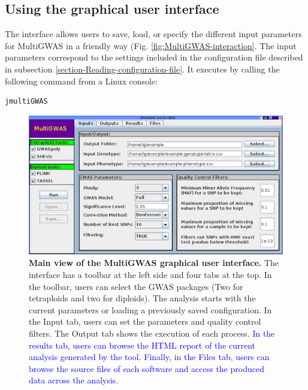 \documentclass{article}
\begin{document}

\subsection{Using the graphical user interface}
The interface allows users to save, load, or specify the different input parameters for MultiGWAS in a friendly way (Fig. \ref{fig:MultiGWAS-interaction}. The input parameters correspond to the settings included in the configuration file described in subsection \ref{section-Reading-configuration-file}. It executes by calling the following command from a Linux console:

\begin{lstlisting}[language=bash,basicstyle={\small}]
jmultiGWAS
\end{lstlisting}

\begin{figure}[H]
\begin{centering}
\includegraphics[scale=0.5]{images/paper-implementation-jmultiGWAS}
\par\end{centering}
\caption{\textbf{Main view of the MultiGWAS graphical user interface.}  The interface has a toolbar at the left side and four tabs at the top. In the toolbar, users can select the GWAS packages (Two for tetraploids and two for diploids). The analysis starts with the current parameters or loading a previously saved configuration. In the Input tab, users can set the parameters and quality control filters. The Output tab shows the execution of each process. \textcolor{blue}{In the results tab, users can browse the HTML report of the current analysis generated by the tool. Finally, in the Files tab, users can browse the source files of each software and access the produced data across the analysis.}}\label{fig: MultiGWAS-interaction} 
\end{figure}
\end{document}
